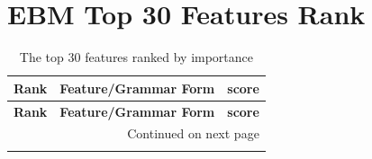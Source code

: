 \section{EBM Top 30 Features Rank}

\begin{longtable}{p{2cm} p{4cm} p{8cm}}
\caption{The top 30 features ranked by importance
\label{tab:top30-importance}}\\
\toprule
\textbf{Rank} & \textbf{Feature/Grammar Form} & \textbf{score}  \\
\midrule
\endfirsthead

\toprule
\textbf{Rank} & \textbf{Feature/Grammar Form} & \textbf{score}\\
\midrule
\endhead

\midrule \multicolumn{3}{r}{{Continued on next page}}\\
\midrule
\endfoot

\bottomrule
\endlastfoot


\end{longtable}
